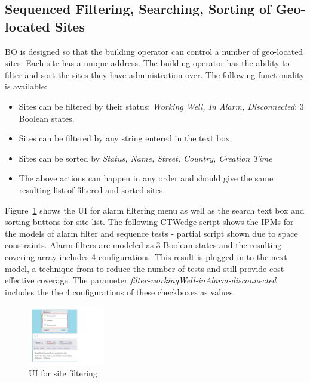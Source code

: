 \documentclass[conference]{IEEEtran}
\begin{document}
	\subsection{Sequenced Filtering, Searching, Sorting of Geo-located Sites}

	BO is designed so that the building operator can control a number of geo-located sites. 
	Each site has a unique address. The building operator has the ability to filter and sort the sites they have administration over.
	The following functionality is available:
	\begin{itemize}
		\item Sites can be filtered by their status: \textit{Working Well, In Alarm, Disconnected}: 3 Boolean states.
		\item Sites can be filtered by any string entered in the text box.
		\item Sites can be sorted by \textit{Status, Name, Street, Country, Creation Time}
		\item The above actions can happen in any order and should give the same resulting list of filtered and sorted sites.
	\end{itemize}

	Figure~\ref{fig:siteFilterModel} shows the UI for alarm filtering menu as well as the search text box and sorting buttons for site list. 
	The following CTWedge script shows the IPMs for the models of alarm filter and sequence tests - partial script shown due to space constraints. 
	Alarm filters are modeled as 3 Boolean states and the resulting covering array includes 4 configurations. 
	This result is plugged in to the next model, a technique from \cite{ozcan2017applications} to reduce the number of tests and still provide cost effective coverage.
	The parameter \textit{filter-workingWell-inAlarm-disconnected} includes the the 4 configurations of these checkboxes as values. 

	\begin{figure}[!b]
		\centering
			\includegraphics[width=0.30\textwidth,]{siteFilterModel.pdf}
			\caption{UI for site filtering}
			\label{fig:siteFilterModel}
	\end{figure}
\end{document}
